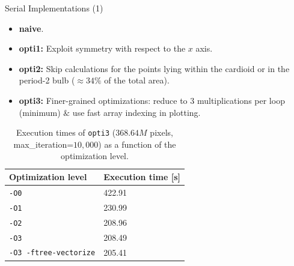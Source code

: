 \documentclass[10pt]{beamer}
\begin{document}
\begin{frame}{Serial Implementations (1)}
	
\begin{itemize}
	\item \textbf{naive}.
	\item \textbf{opti1:} Exploit symmetry with respect to the $x$ axis.
	\item \textbf{opti2:} Skip calculations for the points lying within the cardioid or in the period-2 bulb ($\approx34\%$ of the total area).
	\item \textbf{opti3:} Finer-grained optimizations: reduce to $3$ multiplications per loop (minimum) $\&$ use fast array indexing in plotting.
\end{itemize}

\begin{table}
	\vspace{-0.0cm}
	\begin{minipage}[b]{0.4\linewidth}
		\centering
		\vspace{0.2cm}
		 \label{fig:bulbs}
	\end{minipage}\hfill
	\begin{minipage}[b]{0.56\linewidth}
		\centering
		\scriptsize
		\begin{tabular}{|l|l|} 
			\hline
			\textbf{Optimization level} & \textbf{Execution time [s]} \\ [0.2ex] 
			\hline\hline
			\texttt{-O0} & 422.91 \\ 
			\texttt{-O1} & 230.99 \\
			\texttt{-O2} & 208.96 \\
			\texttt{-O3} & 208.49 \\
			\texttt{-O3 -ftree-vectorize} & 205.41 \\ [0.2ex] 
			\hline
		\end{tabular}
		\vspace{0.2cm}
		\caption{Execution times of \texttt{opti3} ($368.64M$ pixels, max\_iteration=$10,000$) as a function of the optimization level.}
		\label{tab:opti-levels}
		\vspace{-0.2cm}
	\end{minipage}
\end{table}
	
\end{frame}
\end{document}
